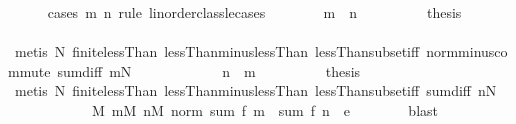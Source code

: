 \begin{isabellebody}
\ \ \ \ \isamarkupfalse%
\ {\isacharparenleft}{\kern0pt}cases\ m\ n\ rule{\isacharcolon}{\kern0pt}\ linorder{\isacharunderscore}{\kern0pt}class{\isachardot}{\kern0pt}le{\isacharunderscore}{\kern0pt}cases{\isacharparenright}{\kern0pt}\isanewline
\ \ \ \ \ \ \isamarkupfalse%
\ {\isachardoublequoteopen}m\ {\isasymle}\ n{\isachardoublequoteclose}\isanewline
\ \ \ \ \ \ \isamarkupfalse%
\ \isamarkupfalse%
\ {\isacharquery}{\kern0pt}thesis\isanewline
\ \ \ \ \ \ \ \ \isamarkupfalse%
\ {\isacharparenleft}{\kern0pt}metis\ N\ finite{\isacharunderscore}{\kern0pt}lessThan\ lessThan{\isacharunderscore}{\kern0pt}minus{\isacharunderscore}{\kern0pt}lessThan\ lessThan{\isacharunderscore}{\kern0pt}subset{\isacharunderscore}{\kern0pt}iff\ norm{\isacharunderscore}{\kern0pt}minus{\isacharunderscore}{\kern0pt}commute\ sum{\isacharunderscore}{\kern0pt}diff\ {\isacartoucheopen}m{\isasymge}N{\isacartoucheclose}{\isacharparenright}{\kern0pt}\isanewline
\ \ \ \ \isamarkupfalse%
\isanewline
\ \ \ \ \ \ \isamarkupfalse%
\ {\isachardoublequoteopen}n\ {\isasymle}\ m{\isachardoublequoteclose}\isanewline
\ \ \ \ \ \ \isamarkupfalse%
\ \isamarkupfalse%
\ {\isacharquery}{\kern0pt}thesis\isanewline
\ \ \ \ \ \ \ \ \isamarkupfalse%
\ {\isacharparenleft}{\kern0pt}metis\ N\ finite{\isacharunderscore}{\kern0pt}lessThan\ lessThan{\isacharunderscore}{\kern0pt}minus{\isacharunderscore}{\kern0pt}lessThan\ lessThan{\isacharunderscore}{\kern0pt}subset{\isacharunderscore}{\kern0pt}iff\ sum{\isacharunderscore}{\kern0pt}diff\ {\isacartoucheopen}n{\isasymge}N{\isacartoucheclose}{\isacharparenright}{\kern0pt}\isanewline
\ \ \ \ \isamarkupfalse%
\isanewline
\ \ \ \ \isamarkupfalse%
\ \isamarkupfalse%
\ {\isachardoublequoteopen}{\isasymexists}M{\isachardot}{\kern0pt}\ {\isasymforall}m{\isasymge}M{\isachardot}{\kern0pt}\ {\isasymforall}n{\isasymge}M{\isachardot}{\kern0pt}\ norm\ {\isacharparenleft}{\kern0pt}sum\ f\ {\isacharbraceleft}{\kern0pt}{\isachardot}{\kern0pt}{\isachardot}{\kern0pt}{\isacharless}{\kern0pt}m{\isacharbraceright}{\kern0pt}\ {\isacharminus}{\kern0pt}\ sum\ f\ {\isacharbraceleft}{\kern0pt}{\isachardot}{\kern0pt}{\isachardot}{\kern0pt}{\isacharless}{\kern0pt}n{\isacharbraceright}{\kern0pt}{\isacharparenright}{\kern0pt}\ {\isacharless}{\kern0pt}\ e{\isachardoublequoteclose}\isanewline
\ \ \ \ \ \ \isamarkupfalse%
\ blast\isanewline
\ \ \isamarkupfalse%

\end{isabellebody}
